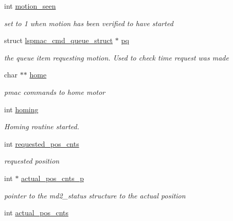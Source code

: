 \begin{DoxyCompactItemize}
int \hyperlink{structlspmac__motor__struct_a68c471836f52707fa8582f7860cf500f}{motion\_\-seen}
\begin{DoxyCompactList}\small\item\em set to 1 when motion has been verified to have started \item\end{DoxyCompactList}\item 
struct \hyperlink{structlspmac__cmd__queue__struct}{lspmac\_\-cmd\_\-queue\_\-struct} $\ast$ \hyperlink{structlspmac__motor__struct_ae0a0c9264f49f51bf72168c3b62f8723}{pq}
\begin{DoxyCompactList}\small\item\em the queue item requesting motion. Used to check time request was made \item\end{DoxyCompactList}\item 
char $\ast$$\ast$ \hyperlink{structlspmac__motor__struct_a073246b8878d75615b0536301b343f3d}{home}
\begin{DoxyCompactList}\small\item\em pmac commands to home motor \item\end{DoxyCompactList}\item 
int \hyperlink{structlspmac__motor__struct_aa74108855693f94fc2ff76333c9fb6ac}{homing}
\begin{DoxyCompactList}\small\item\em Homing routine started. \item\end{DoxyCompactList}\item 
int \hyperlink{structlspmac__motor__struct_a6e8dc9c11dc52a439fe9837230f93ce2}{requested\_\-pos\_\-cnts}
\begin{DoxyCompactList}\small\item\em requested position \item\end{DoxyCompactList}\item 
int $\ast$ \hyperlink{structlspmac__motor__struct_a312047bb71def5cd2443fecd875eaea5}{actual\_\-pos\_\-cnts\_\-p}
\begin{DoxyCompactList}\small\item\em pointer to the md2\_\-status structure to the actual position \item\end{DoxyCompactList}\item 
int \hyperlink{structlspmac__motor__struct_ae5c7aea45b9637a1817be246688fd980}{actual\_\-pos\_\-cnts}
$$
\end{DoxyCompactItemize}
